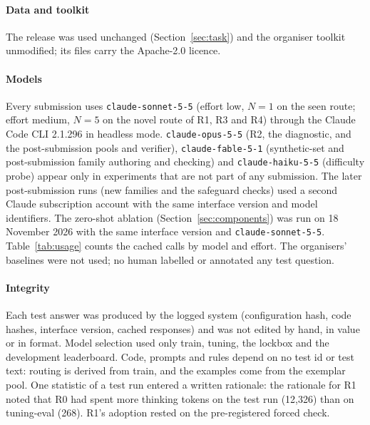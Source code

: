 \documentclass[conference]{IEEEtran}
\newcommand{\id}[1]{\texttt{#1}}
\begin{document}
\paragraph*{Data and toolkit}
The release was used unchanged (Section~\ref{sec:task}) and the organiser toolkit unmodified; its files carry the Apache-2.0 licence.

\paragraph*{Models}
Every submission uses \id{claude-sonnet-5-5} (effort low, $N=1$ on the seen route; effort medium, $N=5$ on the novel route of R1, R3 and R4) through the Claude Code CLI 2.1.296 in headless mode. \id{claude-opus-5-5} (R2, the diagnostic, and the post-submission pools and verifier), \id{claude-fable-5-1} (synthetic-set and post-submission family authoring and checking) and \id{claude-haiku-5-5} (difficulty probe) appear only in experiments that are not part of any submission. The later post-submission runs (new families and the safeguard checks) used a second Claude subscription account with the same interface version and model identifiers. The zero-shot ablation (Section~\ref{sec:components}) was run on 18 November 2026 with the same interface version and \id{claude-sonnet-5-5}. Table~\ref{tab:usage} counts the cached calls by model and effort. The organisers' baselines were not used; no human labelled or annotated any test question.

\paragraph*{Integrity}
Each test answer was produced by the logged system (configuration hash, code hashes, interface version, cached responses) and was not edited by hand, in value or in format. Model selection used only train, tuning, the lockbox and the development leaderboard. Code, prompts and rules depend on no test id or test text: routing is derived from train, and the examples come from the exemplar pool. One statistic of a test run entered a written rationale: the rationale for R1 noted that R0 had spent more thinking tokens on the test run (12,326) than on tuning-eval (268). R1's adoption rested on the pre-registered forced check.
\end{document}
